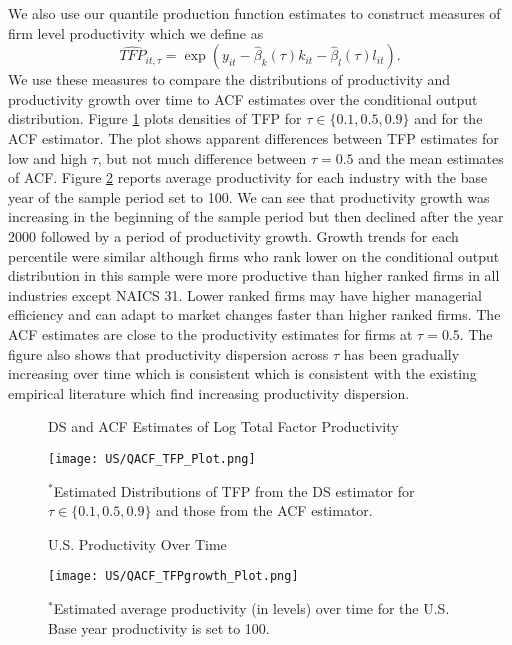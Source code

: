 \documentclass[12pt]{article}
\begin{document}
We also use our quantile production function estimates to construct measures of firm level productivity which we define as
\begin{equation}
\widehat{TFP}_{it,\tau}=\exp(y_{it}-\hat{\beta}_{k}(\tau)k_{it}-\hat{\beta}_{l}(\tau)l_{it}).
\end{equation}
We use these measures to compare the distributions of productivity and productivity growth over time to ACF estimates over the conditional output distribution. Figure \ref{fig:QACFUSTFP} plots densities of TFP for $\tau \in \{0.1, 0.5, 0.9\}$ and for the ACF estimator. The plot shows apparent differences between TFP estimates for low and high $\tau$, but not much difference between $\tau=0.5$ and the mean estimates of ACF. Figure \ref{fig:QACFUSTFPG} reports average productivity for each industry with the base year of the sample period set to 100. We can see that productivity growth was increasing in the beginning of the sample period but then declined after the year 2000 followed by a period of productivity growth. Growth trends for each percentile were similar although firms who rank lower on the conditional output distribution in this sample were more productive than higher ranked firms in all industries except NAICS 31. Lower ranked firms may have higher managerial efficiency and can adapt to market changes faster than higher ranked firms. The ACF estimates are close to the productivity estimates for firms at $\tau=0.5$. The figure also shows that productivity dispersion across $\tau$ has been gradually increasing over time which is consistent which is consistent with the existing empirical literature which find increasing productivity dispersion.
\begin{figure}[H]
\centering
\caption{DS and ACF Estimates of Log Total Factor Productivity}
\texttt{[image: US/QACF\_TFP\_Plot.png]}
\caption*{\footnotesize $^{*}$Estimated Distributions of TFP from the DS estimator for $\tau \in \{0.1, 0.5, 0.9\}$ and those from  the ACF estimator.}
\label{fig:QACFUSTFP}
\end{figure}

\begin{figure}[H]
\centering
\caption{U.S. Productivity Over Time}
\texttt{[image: US/QACF\_TFPgrowth\_Plot.png]}
\caption*{\footnotesize $^{*}$Estimated average productivity (in levels) over time for the U.S. Base year productivity is set to 100.}
\label{fig:QACFUSTFPG}
\end{figure}
\end{document}
